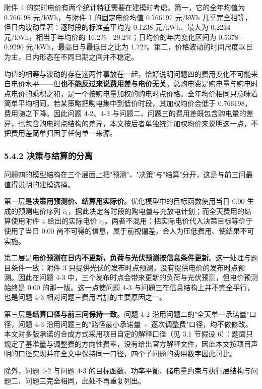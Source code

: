 \documentclass[12pt,a4paper]{ctexart}
\begin{document}
附件 4 的实时电价有两个统计特征需要在建模时考虑。第一，它的全年均值为 0.766198 元/kWh，与附件 1 的固定电价均值 0.766197 元/kWh 几乎完全相等，但日内波动显著：逐时段的标准差平均为 0.1238 元/kWh、最大为 0.2234 元/kWh，相当于年均价的 16.2\%—29.2\%；日均价的年内变化区间为 0.5378—0.9290 元/kWh，最高日与最低日之比为 1.727。第二，价格波动的时间尺度以日为主，日内形态在不同日期之间并不稳定。

均值的相等与波动的存在这两件事放在一起，恰好说明问题四的费用变化不可能来自电价水平——但\textbf{也不能反过来说费用差与电价无关}。总购电费是购电量与购电时点电价的乘积之和，是一个按购电量加权的购电时点价格。全年均价相同只意味着简单平均相同，若某策略把购电集中到低价时段，其加权均价会低于 0.766198，费用随之下降。因此问题 4-2、4-3 与问题二、问题三的费用差既包含购电量的差异，也包含购电时点结构的差异，本文按后者单独统计加权均价来说明这一点，不把费用差简单归因于任何单一来源。

\subsubsection*{5.4.2 决策与结算的分离}

问题四的模型结构在三个层面上把"预测"、"决策"与"结算"分开，这是与前三问最值得说明的建模选择。

第一层是\textbf{决策用预测价、结算用实际价}。优化模型中的目标函数使用当日 0:00 生成的预测电价序列 $\hat{c}_t$，据此决定各时段的购电量与充放电计划；而全天费用的结算使用附件 4 给出的实际电价 $c_t$。两者不混用：把实际电价代入决策目标等价于使用了当日 0:00 尚不可得的信息，属于前视偏差，会人为压低费用、使结果不可实施。

第二层是\textbf{电价预测在日内不更新，负荷与光伏预测按信息条件更新}。这一处理与题目条件一致：附件 3 只提供光伏的发布时点预测，没有提供电价的发布时点预测。因此在问题 4-3 中，三个发布时点会带来更新的负荷与光伏预测，但电价预测始终是 0:00 的那一版。这一点使问题 4-3 与问题三在信息结构上并不完全平行，也是问题 4-3 相对问题三费用增加的主要原因之一。

第三层是\textbf{结算口径与前三问保持一致}。问题 4-2 沿用问题二的"全天单一承诺量"口径，问题 4-3 沿用问题三的"路径最小承诺量 + 逐次调整费"口径，均不做修改。本文对多版承诺的合成方式采用项目自定的解释口径（见 3.1 节假设 6）：题面只规定了基准量与调整费的方向性费率，没有给出官方解释文件，因此本文按项目声明的口径实现并在全文中保持同一口径，四个子问题的费用数字因此可比。

除外，问题 4-2 与问题 4-3 的目标函数、功率平衡、储电量约束与执行层结构与问题二、问题三完全相同，此处不再重复列出。
\end{document}
